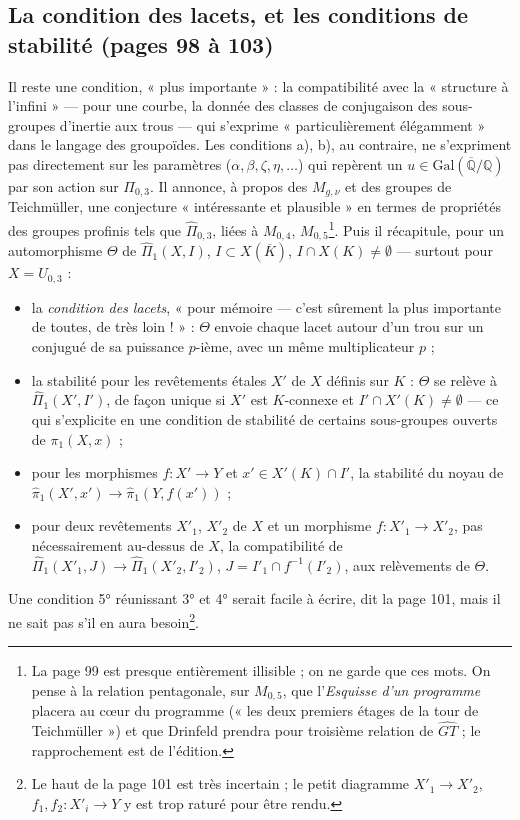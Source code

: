 \documentclass[11pt,a4paper]{article}
\begin{document}
\subsection*{La condition des lacets, et les conditions de stabilité (pages 98 à 103)}

Il reste une condition, « plus importante » : la compatibilité avec la
« structure à l'infini » — pour une courbe, la donnée des classes de
conjugaison des sous-groupes d'inertie aux trous — qui s'exprime
« particulièrement élégamment » dans le langage des groupoïdes. Les conditions
a), b), au contraire, ne s'expriment pas directement sur les paramètres
($\alpha, \beta, \zeta, \eta, \ldots$) qui repèrent un $u \in
\mathrm{Gal}(\overline{\mathbb{Q}}/\mathbb{Q})$ par son action sur
$\Pi_{0,3}$. Il annonce, à propos des $M_{g,\nu}$ et des groupes de
Teichmüller, une conjecture « intéressante et plausible » en termes de
propriétés des groupes profinis tels que $\widehat\Pi_{0,3}$, liées à
$M_{0,4}$, $M_{0,5}$\footnote{La page 99 est presque entièrement illisible ;
on ne garde que ces mots. On pense à la relation pentagonale, sur $M_{0,5}$,
que l'\emph{Esquisse d'un programme} placera au cœur du programme (« les deux
premiers étages de la tour de Teichmüller ») et que Drinfeld prendra pour
troisième relation de $\widehat{GT}$ ; le rapprochement est de l'édition.}.
Puis il récapitule, pour un automorphisme $\Theta$ de $\widehat\Pi_1(X, I)$,
$I \subset X(\overline{K})$, $I \cap X(K) \neq \emptyset$ — surtout pour
$X = U_{0,3}$ :
\begin{itemize}
\item[1)] la \emph{condition des lacets}, « pour mémoire — c'est sûrement la
plus importante de toutes, de très loin ! » : $\Theta$ envoie chaque lacet
autour d'un trou sur un conjugué de sa puissance $p$-ième, avec un même
multiplicateur $p$ ;
\item[2)] la stabilité pour les revêtements étales $X'$ de $X$ définis sur
$K$ : $\Theta$ se relève à $\widehat\Pi_1(X', I')$, de façon unique si $X'$
est $K$-connexe et $I' \cap X'(K) \neq \emptyset$ — ce qui s'explicite en une
condition de stabilité de certains sous-groupes ouverts de $\pi_1(X, x)$ ;
\item[3)] pour les morphismes $f : X' \to Y$ et $x' \in X'(K) \cap I'$, la
stabilité du noyau de $\widehat\pi_1(X', x') \to \widehat\pi_1(Y, f(x'))$ ;
\item[4)] pour deux revêtements $X'_1$, $X'_2$ de $X$ et un morphisme $f :
X'_1 \to X'_2$, pas nécessairement au-dessus de $X$, la compatibilité de
$\widehat\Pi_1(X'_1, J) \to \widehat\Pi_1(X'_2, I'_2)$, $J = I'_1 \cap
f^{-1}(I'_2)$, aux relèvements de $\Theta$.
\end{itemize}
Une condition 5° réunissant 3° et 4° serait facile à écrire, dit la page 101,
mais il ne sait pas s'il en aura besoin\footnote{Le haut de la page 101 est
très incertain ; le petit diagramme $X'_1 \to X'_2$, $f_1, f_2 : X'_i \to Y$ y
est trop raturé pour être rendu.}.
\end{document}
